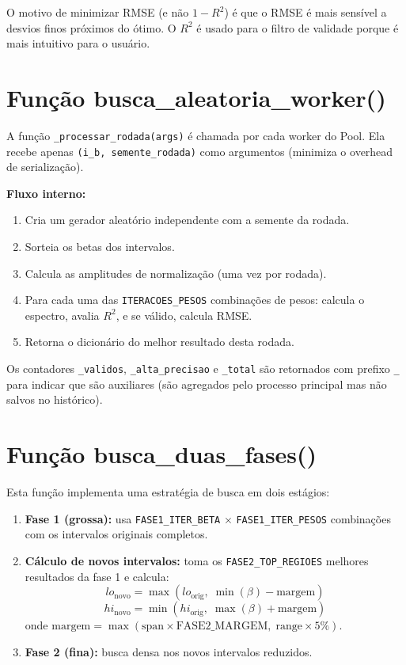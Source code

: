 \documentclass[12pt,a4paper]{report}
\newcommand{\code}[1]{\texttt{#1}}
\begin{document}
O motivo de minimizar RMSE (e não $1 - R^2$) é que o RMSE é mais sensível
a desvios finos próximos do ótimo. O $R^2$ é usado para o filtro de validade
porque é mais intuitivo para o usuário.

\section{Função busca\_aleatoria\_worker()}

A função \code{\_processar\_rodada(args)} é chamada por cada worker do Pool.
Ela recebe apenas \code{(i\_b, semente\_rodada)} como argumentos (minimiza
o overhead de serialização).

\textbf{Fluxo interno:}
\begin{enumerate}
  \item Cria um gerador aleatório independente com a semente da rodada.
  \item Sorteia os betas dos intervalos.
  \item Calcula as amplitudes de normalização (uma vez por rodada).
  \item Para cada uma das \code{ITERACOES\_PESOS} combinações de pesos:
    calcula o espectro, avalia $R^2$, e se válido, calcula RMSE.
  \item Retorna o dicionário do melhor resultado desta rodada.
\end{enumerate}

Os contadores \code{\_validos}, \code{\_alta\_precisao} e \code{\_total}
são retornados com prefixo \code{\_} para indicar que são auxiliares
(são agregados pelo processo principal mas não salvos no histórico).

\section{Função busca\_duas\_fases()}

Esta função implementa uma estratégia de busca em dois estágios:

\begin{enumerate}
  \item \textbf{Fase 1 (grossa):} usa \code{FASE1\_ITER\_BETA} $\times$
    \code{FASE1\_ITER\_PESOS} combinações com os intervalos originais completos.

  \item \textbf{Cálculo de novos intervalos:} toma os \code{FASE2\_TOP\_REGIOES}
    melhores resultados da fase 1 e calcula:
    \[
      lo_{\text{novo}} = \max(lo_{\text{orig}},\; \min(\beta) - \text{margem})
    \]
    \[
      hi_{\text{novo}} = \min(hi_{\text{orig}},\; \max(\beta) + \text{margem})
    \]
    onde $\text{margem} = \max(\text{span} \times \text{FASE2\_MARGEM},\;
    \text{range} \times 5\%)$.

  \item \textbf{Fase 2 (fina):} busca densa nos novos intervalos reduzidos.
\end{enumerate}
\end{document}
